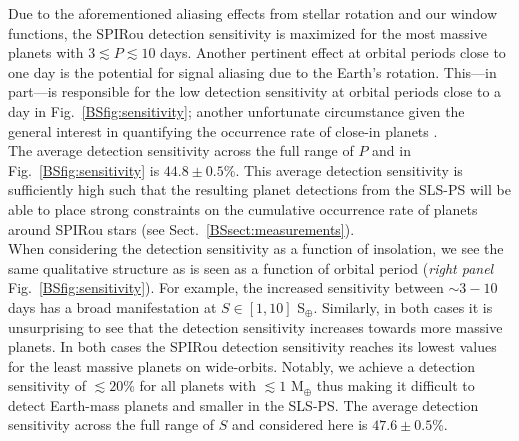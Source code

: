 Due to the
aforementioned aliasing effects from stellar rotation and our window functions, the SPIRou detection
sensitivity is maximized for the most massive planets with $3 \lesssim P \lesssim 10$ days. 
Another pertinent effect at orbital periods close to one day is the potential for signal aliasing due to the
Earth's rotation. This---in part---is responsible for the low detection sensitivity at orbital periods close
to a day in Fig.~\ref{BSfig:sensitivity}; another unfortunate circumstance given the general interest in
quantifying the occurrence rate of close-in planets \citep{mulders15}. \\

The average detection sensitivity across the full range of $P$ and
\msini{} in Fig.~\ref{BSfig:sensitivity} is $44.8 \pm 0.5$\%.
This average detection sensitivity is sufficiently high such that the
resulting planet detections from the SLS-PS will be able to place strong constraints on the cumulative
occurrence rate of planets around SPIRou stars (see Sect.~\ref{BSsect:measurements}). \\

When considering the detection sensitivity as a function of insolation, we see the same
qualitative structure as is seen as a function of orbital period (\emph{right panel}
Fig.~\ref{BSfig:sensitivity}). For example, the increased
sensitivity between $\sim 3-10$ days has a broad manifestation at $S \in [1,10]$ S$_{\oplus}$.
Similarly, in both cases it is unsurprising to see that the detection sensitivity increases
towards more massive planets. In both cases the SPIRou
detection sensitivity reaches its lowest values for the least massive planets on wide-orbits.
Notably, we achieve a detection sensitivity of $\lesssim 20$\% for all planets with
\msini{} $\lesssim 1$ M$_{\oplus}$ thus making it difficult to detect Earth-mass planets and
smaller in the SLS-PS. The average detection sensitivity across the full range of $S$ and
\msini{} considered here is $47.6 \pm 0.5$\%.


